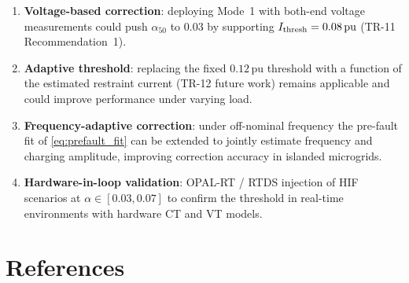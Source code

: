 \documentclass[11pt,a4paper]{article}
\newcommand{\alphafifty}{\alpha_{50}}
\newcommand{\pu}{\,\text{pu}}
\begin{document}
\begin{enumerate}
  \item \textbf{Voltage-based correction}: deploying Mode~1 with both-end
        voltage measurements could push $\alphafifty$ to 0.03 by supporting
        $I_{\rm thresh} = 0.08\pu$ (TR-11 Recommendation~1).
  \item \textbf{Adaptive threshold}: replacing the fixed $0.12\pu$ threshold
        with a function of the estimated restraint current (TR-12 future work)
        remains applicable and could improve performance under varying load.
  \item \textbf{Frequency-adaptive correction}: under off-nominal frequency
        the pre-fault fit of \eqref{eq:prefault_fit} can be extended to
        jointly estimate frequency and charging amplitude, improving
        correction accuracy in islanded microgrids.
  \item \textbf{Hardware-in-loop validation}: OPAL-RT / RTDS injection of HIF
        scenarios at $\alpha \in [0.03, 0.07]$ to confirm the threshold in
        real-time environments with hardware CT and VT models.
\end{enumerate}

\section*{References}


\end{document}
